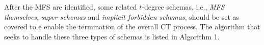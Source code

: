 \documentclass{sig-alternate}
\begin{document}
%


After the MFS are identified, some related $t$-degree schemas, i.e., \emph{MFS themselves}, \emph{super-schemas} and \emph{implicit forbidden schemas}, should be set as covered to e enable the termination of the overall CT process. The algorithm that seeks to handle these three types of schemas is listed in Algorithm 1.
\end{document}
